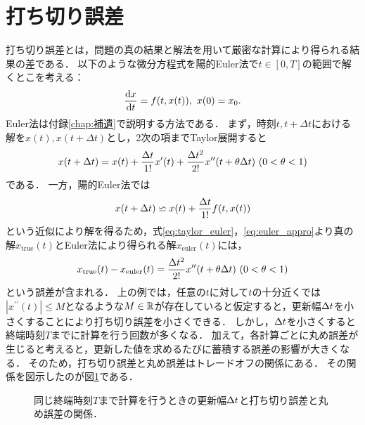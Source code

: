 \section{打ち切り誤差}
打ち切り誤差とは，問題の真の結果と解法を用いて厳密な計算により得られる結果の差である．
以下のような微分方程式を陽的Euler法で$t \in [0,T]$の範囲で解くとこを考える：
\begin{equation*}
    \frac{\mathrm{d}x}{\mathrm{d}t} = f(t,x(t)), \ x(0) = x_0.
\end{equation*}
Euler法は付録\ref{chap:補遺}で説明する方法である．
まず，時刻$t,t+\Delta t$における解を$x(t),x(t+\Delta t)$とし，2次の項までTaylor展開すると
\begin{align}
    \label{eq:taylor_euler}
    x(t + \Delta t) = x(t) + \frac{\Delta t}{1!}x^{\prime}(t) + \frac{\Delta t^2}{2!}x^{\prime\prime}(t + \theta\Delta t) \ (0 < \theta < 1)
\end{align}
である．
一方，陽的Euler法では
\begin{align}
    \label{eq:euler_appro}
    x(t + \Delta t) \backsimeq x(t) + \frac{\Delta t}{1!}f(t,x(t))
\end{align}
という近似により解を得るため，式\eqref{eq:taylor_euler}，\eqref{eq:euler_appro}より真の解$x_{\mathrm{true}}(t)$とEuler法により得られる解$x_{\mathrm{euler}}(t)$には，
\begin{align*}
    x_{\mathrm{true}}(t) - x_{\mathrm{euler}}(t) = \frac{\Delta t^2}{2!}x^{\prime\prime}(t + \theta\Delta t) \ (0 < \theta < 1)
\end{align*}
という誤差が含まれる．
上の例では，任意の$t$に対して$t$の十分近くでは$|x^{\prime\prime}(t)| \leq M$となるような$M \in \mathbb{R}$が存在していると仮定すると，更新幅$\Delta t$を小さくすることにより打ち切り誤差を小さくできる．
しかし，$\Delta t$を小さくすると終端時刻$T$までに計算を行う回数が多くなる．
加えて，各計算ごとに丸め誤差が生じると考えると，更新した値を求めるたびに蓄積する誤差の影響が大きくなる．
そのため，打ち切り誤差と丸め誤差はトレードオフの関係にある．
その関係を図示したのが図\ref{fig:error_tradingoff}である．
\begin{figure}[H]
    \centering
    \caption{同じ終端時刻$T$まで計算を行うときの更新幅$\Delta t$と打ち切り誤差と丸め誤差の関係．}
    \label{fig:error_tradingoff}
\end{figure}

